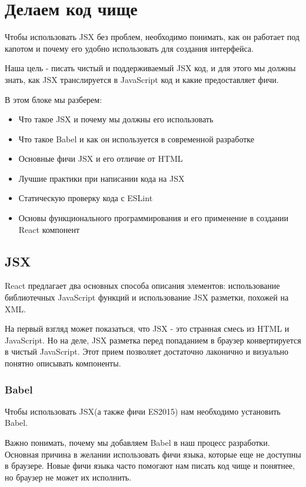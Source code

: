 \chapter{Делаем код чище}

Чтобы использовать JSX без проблем, необходимо понимать, как он работает под капотом и почему его удобно использовать для создания интерфейса.

Наша цель - писать чистый и поддерживаемый JSX код, и для этого мы должны знать, как JSX транслируется в JavaScript код и какие предоставляет фичи.

В этом блоке мы разберем:

\begin{itemize}
  \item Что такое JSX и почему мы должны его использовать
  \item Что такое Babel и как он используется в современной разработке
  \item Основные фичи JSX и его отличие от HTML
  \item Лучшие практики при написании кода на JSX
  \item Статическую проверку кода с ESLint 
  \item Основы функционального программирования и его применение в создании React компонент
\end{itemize}


\section{JSX}

React предлагает два основных способа описания элементов: использование библиотечных JavaScript функций и использование JSX разметки, похожей на XML. 

На первый взгляд может показаться, что JSX - это странная смесь из HTML и JavaScript. Но на деле, JSX разметка перед попаданием в браузер конвертируется в чистый JavaScript. Этот прием позволяет достаточно лаконично и визуально понятно описывать компоненты.

\subsection{Babel}

Чтобы использовать JSX(а также фичи ES2015) нам необходимо установить Babel. 

Важно понимать, почему мы добавляем Babel в наш процесс разработки. Основная причина в желании использовать фичи языка, которые еще не доступны в браузере. Новые фичи языка часто помогают нам писать код чище и понятнее, но браузер не может их исполнить.

